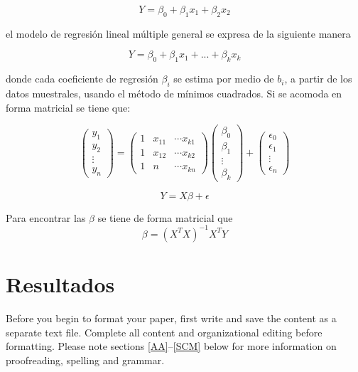 \documentclass[conference]{IEEEtran}
\begin{document}
\begin{equation}
Y= \beta_0 + \beta_1x_1 + \beta_2x_2
\end{equation}

el modelo de regresión lineal múltiple general se expresa de la siguiente manera 


\begin{equation}
Y= \beta_0 + \beta_1x_1 + ... + \beta_kx_k
\end{equation}

donde cada coeficiente de regresión $\beta_i$ se estima por medio de $b_i$, a partir de los datos muestrales, usando el método de mínimos cuadrados. Si se acomoda en forma matricial se tiene que:

\begin{equation}
\begin{pmatrix}
y_1 \\
y_2 \\
\vdots \\
y_n 
\end{pmatrix}
=
\begin{pmatrix}
1 & x_{11} & \dotsi x_{k1}\\
1 & x_{12} & \dotsi x_{k2}\\
1 & n & \dotsi x_{kn}
\end{pmatrix}
\begin{pmatrix}
\beta_0 \\
\beta_1 \\
\vdots \\
\beta_k
\end{pmatrix}
+
\begin{pmatrix}
\epsilon_0 \\
\epsilon_1 \\
\vdots \\
\epsilon_n
\end{pmatrix}
\end{equation}

\begin{equation}
Y=X\beta+\epsilon
\end{equation}

Para encontrar las $\beta$ se tiene de forma matricial que
\begin{equation}
\beta=(X^TX)^{-1}X^TY
\end{equation}
\section{Resultados}
Before you begin to format your paper, first write and save the content as a 
separate text file. Complete all content and organizational editing before 
formatting. Please note sections \ref{AA}--\ref{SCM} below for more information on 
proofreading, spelling and grammar.
\end{document}
